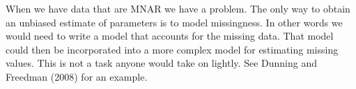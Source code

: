 \documentclass[]{article}
\begin{document}
When we have data that are MNAR we have a problem. The only way to obtain an unbiased estimate of parameters is to model missingness. In other words we would need to write a model that accounts for the missing data. That model could then be incorporated into a more complex model for estimating missing values. This is not a task anyone would take on lightly. See Dunning and Freedman (2008) for an example.
\end{document}
